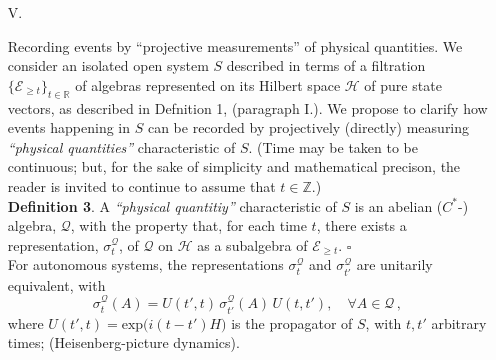 \documentclass[12pt]{article}
\begin{document}
\begin{enumerate}
\item[V.]{{Recording events by ``projective measurements'' of physical quantities}. We consider an isolated open system $S$ described in terms of a filtration $\lbrace \mathcal{E}_{\geq t} \rbrace_{t \in \mathbb{R}}$ of algebras represented on its Hilbert space $\mathcal{H}$ of pure state vectors, as described in Defnition 1, (paragraph I.). We propose to clarify how events happening in $S$ can be recorded by projectively (directly) measuring \textit{``physical quantities''} characteristic of $S$. (Time may be taken to be continuous; but, for the sake of simplicity and mathematical precison, the reader is invited to continue to assume that $t \in \mathbb{Z}$.) \\

{\bf{Definition 3}}. A \textit{``physical quantitiy''} characteristic of $S$ is an abelian ($C^{*}$-) algebra, $\mathcal{Q}$, with the property that, for each time $t$, there exists a representation, $\sigma_{t}^{\mathcal{Q}}$, of $\mathcal{Q}$ on $\mathcal{H}$ as a subalgebra of $\mathcal{E}_{\geq t}$. \hspace{3.5cm} $\square$\\

For autonomous systems, the representations $\sigma_{t}^{\mathcal{Q}}$ and $\sigma_{t'}^{\mathcal{Q}}$ are unitarily equivalent, with
$$\sigma_{t}^{\mathcal{Q}}(A) = U(t',t)\,\sigma_{t'}^{\mathcal{Q}}(A)\, U(t,t'), \quad \forall A \in \mathcal{Q}\,,$$
where $U(t',t)= \text{exp}\big(i(t-t')H\big)$ is the propagator of $S$, with $t,t'$ arbitrary times; (Heisenberg-picture dynamics).


}
\end{enumerate}
\end{document}
